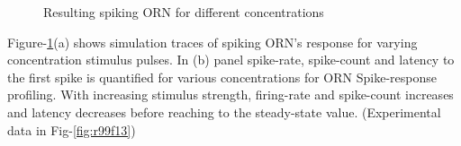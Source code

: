 \documentclass[
]{article}
\begin{document}
\begin{figure}

{\centering {}

}

\caption{Resulting spiking ORN for different concentrations}\label{fig:rCon}
\end{figure}

Figure-\ref{fig:rCon}(a) shows simulation traces of spiking ORN's response for varying concentration stimulus pulses. In (b) panel spike-rate, spike-count and latency to the first spike is quantified for various concentrations for ORN Spike-response profiling. With increasing stimulus strength, firing-rate and spike-count increases and latency decreases before reaching to the steady-state value. (Experimental data in Fig-\ref{fig:r99f13})
\end{document}
